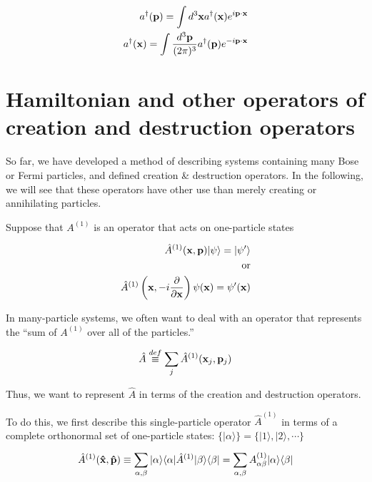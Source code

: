 \begin{align}
\begin{split}
a^\dagger({\bf p}) = \int d^3{\bf x} a^\dagger({\bf x}) e^{i{\bf p}\cdot{\bf x}}\\
a^\dagger({\bf x}) = \int\frac{d^3{\bf p}}{(2\pi)^3} a^\dagger({\bf p}) e^{-i{\bf p}\cdot{\bf x}}
\end{split}
\end{align}

\section[Hamiltonian and other operators in second quantization]{Hamiltonian and other operators of creation and destruction operators}

So far, we have developed a method of describing systems containing many Bose or Fermi particles, and defined creation \& destruction operators. In the following, we will see that these operators have other use than merely creating or annihilating particles. 

Suppose that $A^{(1)}$ is an operator that acts on one-particle states

\begin{align}
\begin{split}
\hat{A}^{(1)}({\bf x},{\bf p})|\psi\rangle = |\psi'\rangle \\
\text{or}\\
\hat{A}^{(1)}\left({\bf x},-i\frac{\partial}{\partial {\bf x}}\right)\psi({\bf x}) = \psi'({\bf x})
\end{split}
\end{align}

In many-particle systems, we often want to deal with an operator that represents the ``sum of $A^{(1)}$ over all of the particles.''

\begin{align}
\hat{A}\overset{def}{\equiv}\sum_j\hat{A}^{(1)}({\bf x}_j,{\bf p}_j)
\end{align}

Thus, we want to represent $\hat{A}$ in terms of the creation and destruction operators. 

To do this, we first describe this single-particle operator $\hat{A}^{(1)}$ in terms of a complete orthonormal set of one-particle states: $\{|\alpha\rangle\} = \{|1\rangle,|2\rangle,\cdots\}$

\begin{align}
\hat{A}^{(1)}({\bf \hat{x}, \hat{p}}) \equiv \sum_{\alpha,\beta}|\alpha\rangle\langle\alpha| \hat{A}^{(1)}|\beta\rangle\langle\beta| = \sum_{\alpha,\beta}A^{(1)}_{\alpha\beta}|\alpha\rangle\langle\beta|
\end{align}

